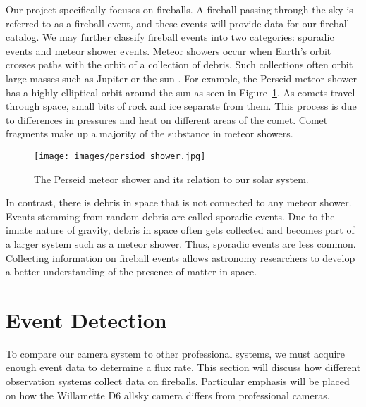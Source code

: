 Our project specifically focuses on fireballs.
A fireball passing through the sky is referred to as a fireball event, and these events will provide data for our fireball catalog.
We may further classify fireball events into two categories: sporadic events and meteor shower events.
Meteor showers occur when Earth's orbit crosses paths with the orbit of a collection of debris. 
Such collections often orbit large masses such as Jupiter or the sun \cite{trigo-rodriguez_2006_2007}.  
For example, the Perseid meteor shower has a highly elliptical orbit around the sun as seen in Figure~\ref{perceid}.  
As comets travel through space, small bits of rock and ice separate from them.
This process is due to differences in pressures and heat on different areas of the comet.
Comet fragments make up a majority of the substance in meteor showers.

\begin{figure}[ht!]
  \centering
  \texttt{[image: images/persiod\_shower.jpg]}
  \caption{The Perseid meteor shower and its relation to our solar system.}
  \label{perceid}
\end{figure}

In contrast, there is debris in space that is not connected to any meteor shower. 
Events stemming from random debris are called sporadic events.
Due to the innate nature of gravity, debris in space often gets collected and becomes part of a larger system such as a meteor shower.
Thus, sporadic events are less common.
Collecting information on fireball events allows astronomy researchers to develop a better understanding of the presence of matter in space. %


\section{Event Detection}

To compare our camera system to other professional systems, we must acquire enough event data to determine a flux rate.  
This section will discuss how different observation systems collect data on fireballs.
Particular emphasis will be placed on how the Willamette D6 allsky camera differs from professional cameras.


